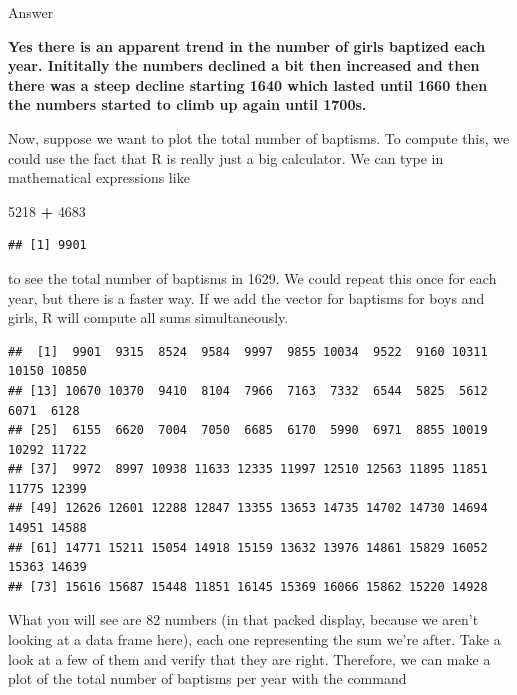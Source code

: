 \documentclass[
]{article}
\newenvironment{Shaded}{\begin{snugshade}}{\end{snugshade}}
\newcommand{\DecValTok}[1]{\textcolor[rgb]{0.00,0.00,0.81}{#1}}
\newcommand{\NormalTok}[1]{#1}
\newcommand{\OperatorTok}[1]{\textcolor[rgb]{0.81,0.36,0.00}{\textbf{#1}}}
\newcommand{\StringTok}[1]{\textcolor[rgb]{0.31,0.60,0.02}{#1}}
\begin{document}
{Answer}

\textbf{Yes there is an apparent trend in the number of girls baptized
each year. Inititally the numbers declined a bit then increased and then
there was a steep decline starting 1640 which lasted until 1660 then the
numbers started to climb up again until 1700s.}

Now, suppose we want to plot the total number of baptisms. To compute
this, we could use the fact that R is really just a big calculator. We
can type in mathematical expressions like

\begin{Shaded}
\begin{Highlighting}[]
\DecValTok{5218} \OperatorTok{+}\StringTok{ }\DecValTok{4683}
\end{Highlighting}
\end{Shaded}

\begin{verbatim}
## [1] 9901
\end{verbatim}

to see the total number of baptisms in 1629. We could repeat this once
for each year, but there is a faster way. If we add the vector for
baptisms for boys and girls, R will compute all sums simultaneously.

\begin{Shaded}
\end{Shaded}

\begin{verbatim}
##  [1]  9901  9315  8524  9584  9997  9855 10034  9522  9160 10311 10150 10850
## [13] 10670 10370  9410  8104  7966  7163  7332  6544  5825  5612  6071  6128
## [25]  6155  6620  7004  7050  6685  6170  5990  6971  8855 10019 10292 11722
## [37]  9972  8997 10938 11633 12335 11997 12510 12563 11895 11851 11775 12399
## [49] 12626 12601 12288 12847 13355 13653 14735 14702 14730 14694 14951 14588
## [61] 14771 15211 15054 14918 15159 13632 13976 14861 15829 16052 15363 14639
## [73] 15616 15687 15448 11851 16145 15369 16066 15862 15220 14928
\end{verbatim}

What you will see are 82 numbers (in that packed display, because we
aren't looking at a data frame here), each one representing the sum
we're after. Take a look at a few of them and verify that they are
right. Therefore, we can make a plot of the total number of baptisms per
year with the command
\end{document}
